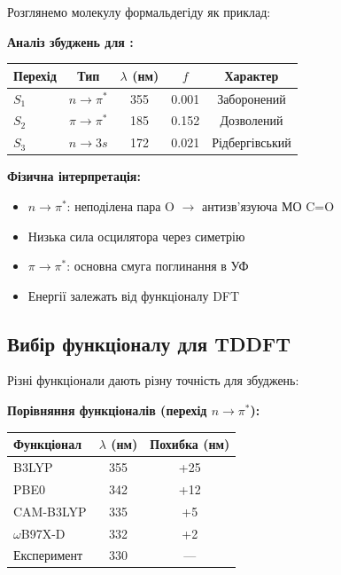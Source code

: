 Розглянемо молекулу формальдегіду  як приклад:


\textbf{Аналіз збуджень для :}
\begin{center}
    \begin{tabular}{lcccc}
        \toprule
        Перехід & Тип           & $\lambda$ (нм) & $f$   & Характер       \\
        \midrule
        $S_1$   & $n\to\pi^*$   & 355            & 0.001 & Заборонений    \\
        $S_2$   & $\pi\to\pi^*$ & 185            & 0.152 & Дозволений     \\
        $S_3$   & $n\to 3s$     & 172            & 0.021 & Рідбергівський \\
        \bottomrule
    \end{tabular}
\end{center}

\textbf{Фізична інтерпретація:}
\begin{itemize}
    \item $n\to\pi^*$: неподілена пара O $\to$ антизв'язуюча МО C=O
    \item Низька сила осцилятора через симетрію
    \item $\pi\to\pi^*$: основна смуга поглинання в УФ
    \item Енергії залежать від функціоналу DFT
\end{itemize}

\subsection{Вибір функціоналу для TDDFT}

Різні функціонали дають різну точність для збуджень:


\textbf{Порівняння функціоналів (перехід $n\to\pi^*$):}
\begin{center}
    \begin{tabular}{lcc}
        \toprule
        Функціонал     & $\lambda$ (нм) & Похибка (нм) \\
        \midrule
        B3LYP          & 355            & +25          \\
        PBE0           & 342            & +12          \\
        CAM-B3LYP      & 335            & +5           \\
        $\omega$B97X-D & 332            & +2           \\
        \midrule
        Експеримент    & 330            & ---          \\
        \bottomrule
    \end{tabular}
\end{center}

